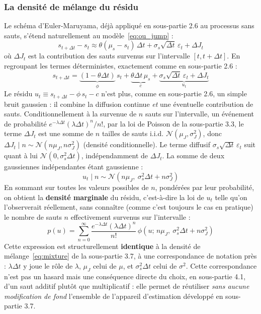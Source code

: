 \documentclass{article}
\begin{document}
\subsubsection*{La densité de mélange du résidu}
Le schéma d'Euler-Maruyama, déjà appliqué en sous-partie 2.6 au processus sans sauts, s'étend naturellement au modèle~\eqref{eq:ou_jump} :
\begin{equation}
s_{t+\Delta t} - s_t \approx \theta(\mu_s-s_t)\,\Delta t + \sigma_s\sqrt{\Delta t}\,\varepsilon_t + \Delta J_t
\end{equation}
où $\Delta J_t$ est la contribution des sauts survenus sur l'intervalle $[t,t+\Delta t]$.  En regroupant les termes déterministes, exactement comme en sous-partie 2.6 :
\begin{equation}
s_{t+\Delta t} = \underbrace{(1-\theta\Delta t)}_{\phi}\, s_t + \underbrace{\theta\Delta t\,\mu_s}_{c} + \underbrace{\sigma_s\sqrt{\Delta t}\,\varepsilon_t + \Delta J_t}_{u_t}
\end{equation}
Le résidu $u_t \equiv s_{t+\Delta t} - \phi\, s_t - c$ n'est plus, comme en sous-partie 2.6, un simple bruit gaussien : il combine la diffusion continue \emph{et} une éventuelle contribution de sauts. Conditionnellement à la survenue de $n$ sauts sur l'intervalle, un événement de probabilité $e^{-\lambda\Delta t}(\lambda\Delta t)^n/n!$, par la loi de Poisson de la sous-partie 3.3, le terme $\Delta J_t$ est une somme de $n$ tailles de sauts i.i.d. $\mathcal{N}(\mu_J,\sigma_J^2)$, donc $\Delta J_t \mid n \sim \mathcal{N}(n\mu_J, n\sigma_J^2)$ (densité conditionnelle). Le terme diffusif $\sigma_s\sqrt{\Delta t}\,\varepsilon_t$ suit quant à lui $\mathcal{N}(0,\sigma_s^2\Delta t)$, indépendamment de $\Delta J_t$. La somme de deux gaussiennes indépendantes étant gaussienne :
\begin{equation}
u_t \mid n \sim \mathcal{N}\left(n\mu_J,\ \sigma_s^2\Delta t + n\sigma_J^2\right)
\end{equation}
En sommant sur toutes les valeurs possibles de $n$, pondérées par leur probabilité, on obtient la \textbf{densité marginale} du résidu, c'est-à-dire la loi de $u_t$ telle qu'on l'observerait réellement, sans connaître (comme c'est toujours le cas en pratique) le nombre de sauts $n$ effectivement survenus sur l'intervalle :
\begin{equation}
p(u) = \sum_{n=0}^{\infty} \frac{e^{-\lambda\Delta t}(\lambda\Delta t)^n}{n!}\, \phi\!\left(u;\, n\mu_J,\ \sigma_s^2\Delta t+n\sigma_J^2\right)
\label{eq:mixture_spread}
\end{equation}
Cette expression est structurellement \textbf{identique} à la densité de mélange~\eqref{eq:mixture} de la sous-partie 3.7, à une correspondance de notation près : $\lambda\Delta t$ y joue le rôle de $\lambda$, $\mu_J$ celui de $\mu$, et $\sigma_s^2\Delta t$ celui de $\sigma^2$. Cette correspondance n'est pas un hasard mais une conséquence directe du choix, en sous-partie 4.1, d'un saut additif plutôt que multiplicatif : elle permet de réutiliser \emph{sans aucune modification de fond} l'ensemble de l'appareil d'estimation développé en sous-partie 3.7.
\end{document}
